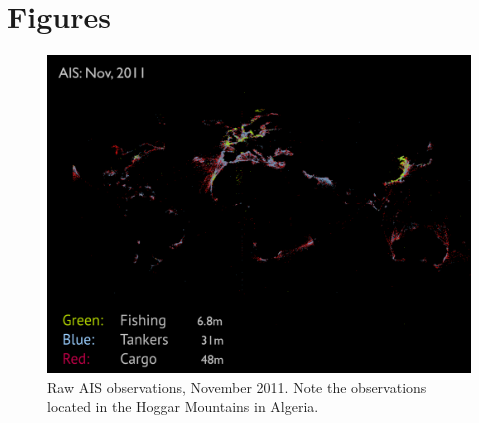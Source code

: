 \appendix{}
\gdef\thesection{Appendix \Alph{section}}

\section{Figures}
\label{sec:figures}

\begin{figure}[htbp]
  \centering
  \includegraphics[width=160mm]{figures/ais-nov-2011.pdf}
  \caption{Raw AIS observations, November 2011. Note the observations located in the Hoggar Mountains in Algeria.}
  \label{fig:ais-obs-nov-2011}
\end{figure}

